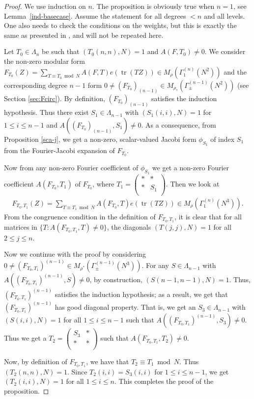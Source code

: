 \documentclass[11pt]{amsart}
\numberwithin{equation}{section}
\newcommand{\smat}[4]{\left( \begin{smallmatrix} #1 & #2 \\ #3 & #4 \\ \end{smallmatrix} \right)}
\DeclareMathOperator{\tr}{tr}
\begin{document}
\begin{proof}
We use induction on $n$. The proposition is obviously true when $n=1$, see Lemma~\ref{ind-basecase}. Assume the statement for all degrees $<  n$  and all levels. One also needs to check the conditions on the weights, but this is exactly the same as presented in \cite[Section~4.3]{boche-das}, and will not be repeated here.

Let $T_0\in \Lambda_n$ be such that $(T_0(n,n), N)=1$ and $A(F, T_0)\neq 0$. We consider the non-zero modular form $ F_{T_0}(Z)=\sum_{T\equiv T_0\bmod N}A(F, T)e(\tr(TZ)) \in M_{\rho}(\Gamma_1^{(n)}(N^2))$ and the corresponding degree $n-1$ form $0\neq (F_{T_0})_{(n-1)}\in M_{\rho_*}(\Gamma_\pm^{(n-1)}(N^2))$ (see Section \ref{sec:Fcirc}). By definition, $(F_{T_0})_{(n-1)}$ satisfies the induction hypothesis. Thus there exist $S_1 \in \Lambda_{n-1}$ with $(S_1(i,i), N)=1$ for $1\le i\le n-1$ and $A((F_{T_0})_{(n-1)}, S_1)\neq 0$. As a consequence,  from Proposition \ref{sca-j}, we get a non-zero, scalar-valued Jacobi form $\phi_{S_1}$ of index $S_1$ from the Fourier-Jacobi expansion of $F_{T_0}$.

Now from any non-zero Fourier coefficient of $\phi_{S_1}$ we get a non-zero Fourier coefficient $A(F_{T_0}, T_1)$ of $F_{T_0}$, where $T_1=\smat{*}{*}{*}{S_1}$. Then we look  at
\begin{align}
    F_{T_0,T_1}(Z)= \sum_{T\equiv T_1 \bmod N}A(F_{T_0}, T)e(\tr(TZ))\in M_{\rho}(\Gamma_1^{(n)}(N^3)).
\end{align}
From the congruence condition in the definition of $F_{T_0,T_1}$, it is clear that for all matrices in $\{ T: A(F_{T_0, T_1}, T)\neq 0\}$, the diagonals $(T(j,j), N)=1$ for all $2\le j\le n$.

Now we continue with the proof by considering $0\neq (F_{T_0,T_1})^{(n-1)}\in M_{\rho^*}(\Gamma_\pm^{(n-1)}(N^3))$. For any $S\in \Lambda_{n-1}$ with $A((F_{T_0,T_1})^{(n-1)},S)\neq 0$, by construction, $(S(n-1,n-1),N)=1$. Thus, $(F_{T_0,T_1})^{(n-1)}$ satisfies the induction hypothesis; as a result, we get that $(F_{T_0,T_1})^{(n-1)}$ has good diagonal property. That is, we get an $S_3\in \Lambda_{n-1}$ with $(S(i,i), N)=1$ for all $1\le i\le n-1$ such that $A((F_{T_0,T_1})^{(n-1)}, S_3)\neq 0$. Thus we get a $T_2=\smat{S_3}{*}{*}{*}$ such that $A(F_{T_0,T_1},T_2)\neq 0$.

Now, by definition of $F_{T_0,T_1}$, we have that $T_2\equiv T_1\bmod N$. Thus $(T_2(n,n), N)=1$. Since $T_2(i,i)=S_3(i,i)$ for $1\le i\le n-1$, we get $(T_2(i,i), N)=1$ for all $1\le i\le n$. This completes the proof of the proposition.
\end{proof}
\end{document}
